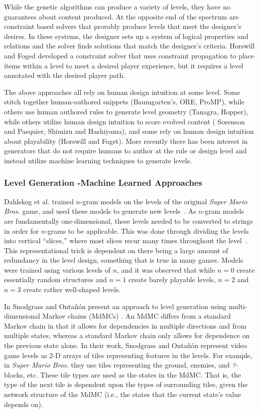 \documentclass[12pt]{report}
\begin{document}
While the genetic algorithms can produce a variety of levels, they have no guarantees about content produced. At the opposite end of the spectrum are constraint based solvers that provably produce levels that meet the designer's desires. In these systems, the designer sets up a system of logical properties and relations and the solver finds solutions that match the designer's criteria.
Horswill and Foged \cite{HORSWILLCONSTRAINT} developed a constraint solver that uses constraint propagation to place items within a level to meet a desired player experience, but it requires a level annotated with the desired player path. 

The above approaches all rely on human design intuition at some level.  Some stitch together human-authored snippets (Baumgarten's, ORE, ProMP), while others use human authored rules to generate level geometry (Tanagra, Hopper), while others  utilize human design intuition to score evolved content ( Sorenson and Pasquier, Shimizu and Hashiyama), and some rely on human design intuition about playability (Horswill and Foget).  More recently there has been interest in generators that do not require humans to author at the rule or design level and instead utilize machine learning techniques to generate levels.

\subsubsection*{Level Generation -Machine Learned Approaches}

Dahlskog et al. trained $n$-gram models on the levels of the original \textit{Super Mario Bros.} game, and used these models to generate new levels~\cite{dahlskog2014linear}. As $n$-gram models are fundamentally one-dimensional, these levels needed to be converted to strings in order for $n$-grams to be applicable. This was done through dividing the levels into vertical ``slices,'' where most slices recur many times throughout the level~\cite{dahlskog2013patterns}. This representational trick is dependent on there being a large amount of redundancy in the level design, something that is true in many games. Models were trained using various levels of $n$, and it was observed that while $n=0$ create essentially random structures and $n=1$ create barely playable levels, $n=2$ and $n=3$ create rather well-shaped levels.


In \cite{snodgrass2014experiments} Snodgrass and Onta{\~n}{\'o}n present an approach to level generation using multi-dimensional Markov chains (MdMCs) \cite{ching2007multi}. An MdMC differs from a standard Markov chain in that it allows for dependencies in multiple directions and from multiple states, whereas a standard Markov chain only allows for dependence on the previous state alone. In their work, Snodgrass and Onta{\~n}{\'o}n represent video game levels as 2-D arrays of tiles representing features in the levels. For example, in \textit{Super Mario Bros.} they use tiles representing the ground, enemies, and {\em ?}-blocks, etc. These tile types are used as the states in the MdMC. That is, the type of the next tile is dependent upon the types of surrounding tiles, given the network structure of the MdMC (i.e., the states that the current state's value depends on).
\end{document}
